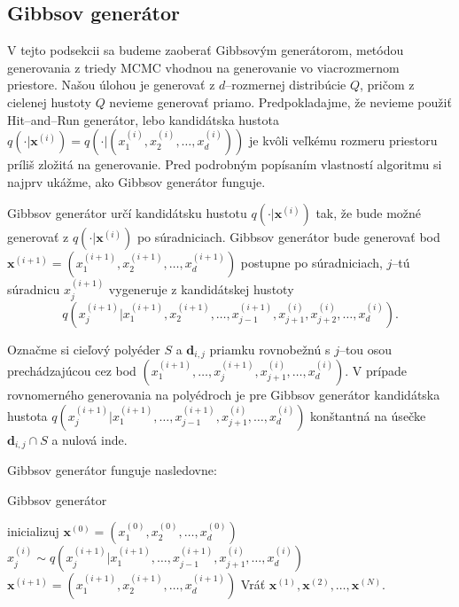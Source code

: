 \subsection{Gibbsov generátor}

V tejto podsekcii sa budeme zaoberať Gibbsovým generátorom, metódou generovania z triedy MCMC vhodnou na generovanie vo viacrozmernom priestore.
Našou úlohou je generovať z $d$--rozmernej distribúcie $Q$, pričom z cielenej hustoty $Q$ nevieme generovať priamo. Predpokladajme, že nevieme použiť Hit--and--Run generátor, lebo kandidátska hustota $q(\cdot| \mathbf x^{(i)})=q(\cdot|(x^{(i)}_1, x^{(i)}_2, \dots, x^{(i)}_d))$ je kvôli veľkému rozmeru priestoru príliš zložitá na generovanie. Pred podrobným popísaním vlastností algoritmu si najprv ukážme, ako Gibbsov generátor funguje.

Gibbsov generátor určí kandidátsku hustotu $q(\cdot|\mathbf x^{(i)})$ tak, že bude možné generovať z $q(\cdot|\mathbf x^{(i)})$ po súradniciach.
Gibbsov generátor bude generovať bod $\mathbf x^{(i+1)}=(x^{(i+1)}_1, x^{(i+1)}_2, \dots, x^{(i+1)}_d)$ postupne po súradniciach, $j$--tú súradnicu $x^{(i+1)}_j$ vygeneruje z kandidátskej hustoty $$q(x^{(i+1)}_j|x^{(i+1)}_1, x^{(i+1)}_2, \dots, x^{(i+1)}_{j-1}, x^{(i)}_{j+1}, x^{(i)}_{j+2}, \dots, x^{(i)}_d).$$

Označme si cieľový polyéder $S$ a $\mathbf d_{i,j}$ priamku rovnobežnú s $j$--tou osou prechádzajúcou cez bod $(x^{(i+1)}_1, \dots, x^{(i+1)}_{j}, x^{(i)}_{j+1}, \dots, x^{(i)}_d)$.
V prípade rovnomerného generovania na polyédroch je pre Gibbsov generátor kandidátska hustota $q(x^{(i+1)}_j|x^{(i+1)}_1, \dots, x^{(i+1)}_{j-1}, x^{(i)}_{j+1}, \dots, x^{(i)}_d)$ konštantná na úsečke $\mathbf d_{i,j} \cap S$ a nulová inde.

Gibbsov generátor funguje nasledovne:

\begin{algorithm}[H]
	\caption{Gibbsov generátor \cite{mcmc_intro_mackay}}
	\label{gibbs}
	\begin{algorithmic}[1]
		\State inicializuj $\mathbf x^{(0)} = (x^{(0)}_1, x^{(0)}_2, \dots, x^{(0)}_d)$
				\State $x^{(i)}_j \sim q(x^{(i+1)}_j|x^{(i+1)}_1, \dots, x^{(i+1)}_{j-1}, x^{(i)}_{j+1}, \dots, x^{(i)}_d)$
			\EndFor
			\State $\mathbf x^{(i+1)}= (x^{(i+1)}_1, x^{(i+1)}_2, \dots, x^{(i+1)}_d)$
		\EndFor
		\State Vráť ${\mathbf x^{(1)},\mathbf x^{(2)},\dots,\mathbf x^{(N)}}$.
	\end{algorithmic}
\end{algorithm}

